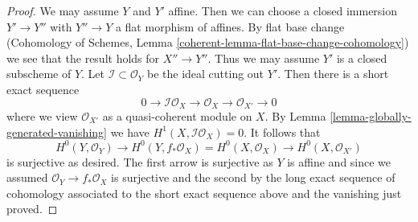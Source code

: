 \documentclass[10pt,a4paper]{amsart}
\theoremstyle{plain}
\theoremstyle{definition}
\theoremstyle{remark}
\numberwithin{equation}{subsection}
\begin{document}
\begin{proof}
We may assume $Y$ and $Y'$ affine. Then we can choose a closed
immersion $Y' \to Y''$ with $Y'' \to Y$ a flat morphism of affines.
By flat base change
(Cohomology of Schemes, Lemma \ref{coherent-lemma-flat-base-change-cohomology})
we see that the result holds for $X'' \to Y''$.
Thus we may assume $Y'$ is a closed subscheme of $Y$.
Let $\mathcal{I} \subset \mathcal{O}_Y$ be the ideal cutting out $Y'$.
Then there is a short exact sequence
$$
0 \to \mathcal{I}\mathcal{O}_X \to
\mathcal{O}_X \to \mathcal{O}_{X'} \to 0
$$
where we view $\mathcal{O}_{X'}$ as a quasi-coherent module on $X$.
By Lemma \ref{lemma-globally-generated-vanishing}
we have $H^1(X, \mathcal{I}\mathcal{O}_X) = 0$.
It follows that
$$
H^0(Y, \mathcal{O}_Y) \to
H^0(Y, f_*\mathcal{O}_X) = H^0(X, \mathcal{O}_X) \to
H^0(X, \mathcal{O}_{X'})
$$
is surjective as desired. The first arrow is surjective as $Y$
is affine and since we assumed $\mathcal{O}_Y \to f_*\mathcal{O}_X$
is surjective and the second by the long exact sequence of
cohomology associated to the short exact sequence above and
the vanishing just proved.
\end{proof}
\end{document}
